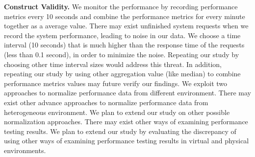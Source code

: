 \noindent \textbf{Construct Validity.}
We monitor the performance by recording performance metrics every 10 seconds and combine the performance metrics for every minute together as a average value. There may exist unfinished system requests when we record the system performance, leading to noise in our data. We choose a time interval (10 seconds) that is much higher than the response time of the requests (less than 0.1 second), in order to minimize the noise. Repeating our study by choosing other time interval sizes would address this threat. In addition, repeating our study by using other aggregation value (like median) to combine performance metrics values may future verify our findings. We exploit two approaches to normalize performance data from different environment. There may exist other advance approaches to normalize performance data from heterogeneous environment. We plan to extend our study on other possible normalization approaches. There may exist other ways of examining performance testing results. We plan to extend our study by evaluating the discrepancy of using other ways of examining performance testing results in virtual and physical environments.



